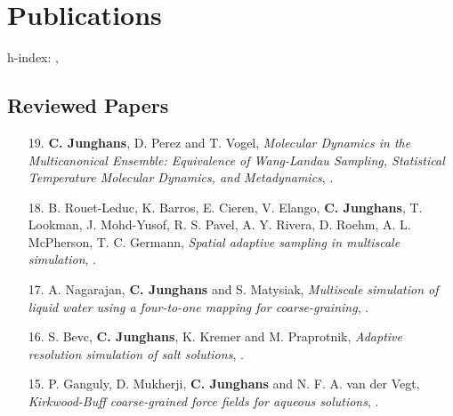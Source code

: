 \documentclass{article}
\begin{document}
\section*{Publications}

h-index: , 

\subsection*{Reviewed Papers}

\begin{enumerate}
\item[19.] \textbf{C. Junghans}, D. Perez and T. Vogel,
  \textit{Molecular Dynamics in the Multicanonical Ensemble: Equivalence of Wang-Landau Sampling, Statistical Temperature Molecular Dynamics, and Metadynamics},
  .

\item[18.] B. Rouet-Leduc, K. Barros, E. Cieren, V. Elango, \textbf{C. Junghans}, T. Lookman, J. Mohd-Yusof, R. S. Pavel, A. Y. Rivera, D. Roehm, A. L. McPherson, T. C. Germann,
  \textit{Spatial adaptive sampling in multiscale simulation},
  .

\item[17.] A. Nagarajan, \textbf{C. Junghans} and S. Matysiak,
  \textit{Multiscale simulation of liquid water using a four-to-one mapping for coarse-graining},
  .

\item[16.] S. Bevc, \textbf{C. Junghans}, K. Kremer and M. Praprotnik,
  \textit{Adaptive resolution simulation of salt solutions},
  .

\item[15.] P. Ganguly, D. Mukherji, \textbf{C. Junghans} and N. F. A. van der Vegt,
  \textit{Kirkwood-Buff coarse-grained force fields for aqueous solutions},
  .


\end{enumerate}
\end{document}
